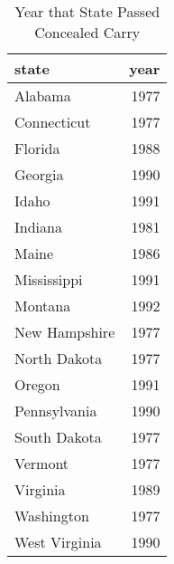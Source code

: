 \begin{table}

\caption{Year that State Passed Concealed Carry}
\centering
\begin{tabular}[t]{lr}
\toprule
state & year\\
\midrule
Alabama & 1977\\
Connecticut & 1977\\
Florida & 1988\\
Georgia & 1990\\
Idaho & 1991\\
\addlinespace
Indiana & 1981\\
Maine & 1986\\
Mississippi & 1991\\
Montana & 1992\\
New Hampshire & 1977\\
\addlinespace
North Dakota & 1977\\
Oregon & 1991\\
Pennsylvania & 1990\\
South Dakota & 1977\\
Vermont & 1977\\
\addlinespace
Virginia & 1989\\
Washington & 1977\\
West Virginia & 1990\\
\bottomrule
\end{tabular}
\end{table}
